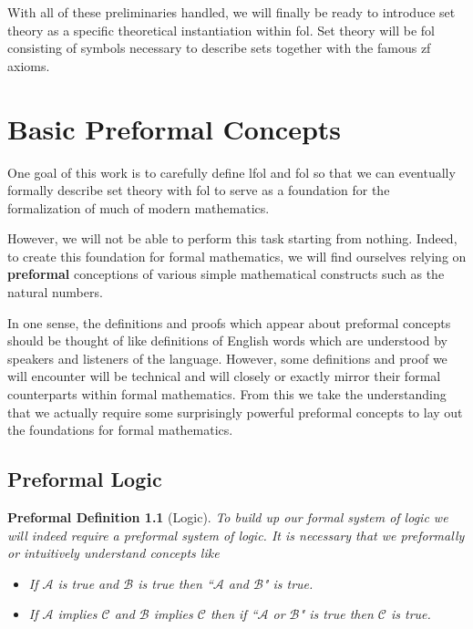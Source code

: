 \documentclass[oneside, 12pt]{book}
\theoremstyle{break}
\newtheorem{preformal definition}[definition]{Preformal Definition}
\newtheorem{preformal theorem}[theorem]{Preformal Theorem}
\newcommand{\mc}[1]{\mathcal{#1}}
\newcommand{\qq}[1]{``#1"}
\begin{document}
			With all of these preliminaries handled, we will finally be ready to introduce set theory as a specific theoretical instantiation within \gls{fol}.
			Set theory will be \gls{fol} consisting of symbols necessary to describe sets together with the famous \gls{zf} axioms.
		
	\chapter{Basic Preformal Concepts}
		\label{ch:preformalbasic}
		One goal of this work is to carefully define \gls{lfol} and \gls{fol} so that we can eventually formally describe set theory with \gls{fol} to serve as a foundation for the formalization of much of modern mathematics.
		
		However, we will not be able to perform this task starting from nothing.
		Indeed, to create this foundation for formal mathematics, we will find ourselves relying on \textbf{preformal} conceptions of various simple mathematical constructs such as the natural numbers.
		
		In one sense, the definitions and proofs which appear about preformal concepts should be thought of like definitions of English words which are understood by speakers and listeners of the language.
		However, some definitions and proof we will encounter will be technical and will closely or exactly mirror their formal counterparts within formal mathematics.
		From this we take the understanding that we actually require some surprisingly powerful preformal concepts to lay out the foundations for formal mathematics.
		
		\section{Preformal Logic}
	
			\begin{preformal definition}[Logic]
				To build up our formal system of logic we will indeed require a preformal system of logic.
				It is necessary that we preformally or intuitively understand concepts like
				\begin{itemize}
					\item{If $\mc{A}$ is true and $\mc{B}$ is true then \qq{$\mc{A}$ and $\mc{B}$} is true.}
					\item{If $\mc{A}$ implies $\mc{C}$ and $\mc{B}$ implies $\mc{C}$ then if \qq{$\mc{A}$ or $\mc{B}$} is true then $\mc{C}$ is true.}
				\end{itemize}
			\end{preformal definition}
			
\end{document}

